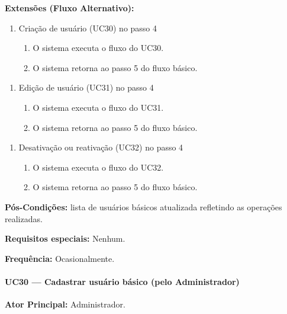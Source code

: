 \textbf{Extensões (Fluxo Alternativo):}

\begin{enumerate}
  \renewcommand{\theenumi}{4a}
  \renewcommand{\labelenumi}{\theenumi.}
  \item Criação de usuário (UC30) no passo 4
  \begin{enumerate}
  \item O sistema executa o fluxo do UC30.
  \item O sistema retorna ao passo 5 do fluxo básico.
  \end{enumerate}
\end{enumerate}

\begin{enumerate}
  \renewcommand{\theenumi}{4b}
  \renewcommand{\labelenumi}{\theenumi.}
  \item Edição de usuário (UC31) no passo 4
  \begin{enumerate}
  \item O sistema executa o fluxo do UC31.
  \item O sistema retorna ao passo 5 do fluxo básico.
  \end{enumerate}
\end{enumerate}

\begin{enumerate}
  \renewcommand{\theenumi}{4c}
  \renewcommand{\labelenumi}{\theenumi.}
  \item Desativação ou reativação (UC32) no passo 4
  \begin{enumerate}
  \item O sistema executa o fluxo do UC32.
  \item O sistema retorna ao passo 5 do fluxo básico.
  \end{enumerate}
\end{enumerate}

\textbf{Pós-Condições:} lista de usuários básicos
atualizada refletindo as operações realizadas.

\textbf{Requisitos especiais:} Nenhum.

\textbf{Frequência:} Ocasionalmente.

\paragraph{UC30 --- Cadastrar usuário básico (pelo Administrador)}\hfill\break

\textbf{Ator Principal:} Administrador.

